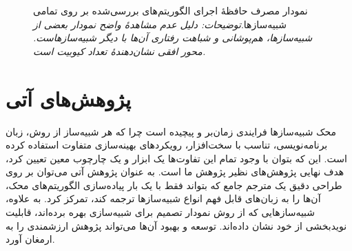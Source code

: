\begin{figure}
	\centering
	\begin{subfigure}[b]{0.3\textwidth}
		\centering
		
		\label{fig:4.2.1}
	\end{subfigure}
	\hfill
	\begin{subfigure}[b]{0.3\textwidth}
		\centering
		
		\label{fig:4.2.2}
	\end{subfigure}
	\hfill
	\begin{subfigure}[b]{0.3\textwidth}
		\centering
		
		\label{fig:4.2.3}
	\end{subfigure}
	\vspace{1em} %
	
	\begin{subfigure}[b]{0.3\textwidth}
		\centering
		
		\label{fig:4.2.4}
	\end{subfigure}
	\hfill
	\begin{subfigure}[b]{0.3\textwidth}
		\centering
		
		\label{fig:4.2.5}
	\end{subfigure}
	\hfill
	\begin{subfigure}[b]{0.3\textwidth}
		\centering
		
		\label{fig:4.2.6}
	\end{subfigure}
	
	\captionsetup{justification=centering}
	\caption[نمودار مصرف حافظهٔ اجرای الگوریتم‌ها]{
		نمودار مصرف حافظهٔ اجرای الگوریتم‌های بررسی‌شده بر روی تمامی شبیه‌سازها.\newline \textit{توضیحات: دلیل عدم مشاهد‌هٔ واضح نمودار بعضی از شبیه‌سازها، هم‌پوشانی و شباهت رفتاری آن‌ها با دیگر شبیه‌سازهاست. محور افقی نشان‌دهندهٔ تعداد کیوبیت است.}
	}
	\label{fig:4.2}
\end{figure}

\section{پژوهش‌های آتی}
محک شبیه‌سازها فرایندی زمان‌بر و پیچیده است چرا که هر شبیه‌ساز از روش، زبان
برنامه‌نویسی، تناسب با سخت‌افزار، رویکردهای بهینه‌سازی متفاوت استفاده کرده است. این که بتوان با وجود تمام این تفاوت‌ها یک ابزار و یک چارچوب معین تعیین کرد، هدف نهایی پژوهش‌های نظیر پژوهش ما است. به عنوان پژوهش آتی می‌توان بر روی طراحی دقیق یک مترجم جامع که بتواند فقط با یک بار پیاده‌سازی الگوریتم‌های محک، آن‌ها را به زبان‌های قابل فهم انواع شبیه‌ساز‌ها ترجمه کند، تمرکز کرد. به علاوه، شبیه‌سازهایی که از روش‌ نمودار تصمیم برای شبیه‌سازی بهره برده‌اند،‌ قابلیت نویدبخشی از خود نشان داده‌اند. توسعه‌ و بهبود آن‌ها می‌تواند پژوهش ارزشمندی را به ارمغان آورد.







